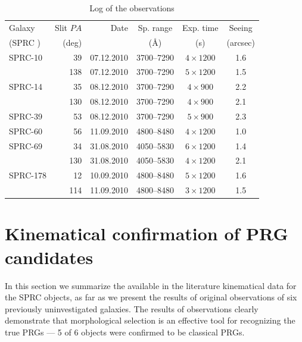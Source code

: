 \documentclass[useAMS,usenatbib]{mn2e}
\begin{document}
\begin{table}
\caption{Log of the observations}\label{tab_obs}
\begin{tabular}{lrrccc}
\hline
Galaxy    & Slit $PA$ & Date             & Sp. range        &  Exp. time             &  Seeing  \\
(SPRC )  &   (deg)&                       &  (\AA)               &     (s)                       &   (arcsec)\\
\hline
SPRC-10        &  39       & 07.12.2010  &    3700--7290 &    $4\times1200$ &   1.6\\
               &  138      & 07.12.2010  &    3700--7290 &    $5\times1200$ &   1.5\\
SPRC-14        &  35       & 08.12.2010  &    3700--7290 &    $4\times900$ &   2.2\\
               &  130      & 08.12.2010  &    3700--7290 &    $4\times900$ &   2.1\\
SPRC-39        &  53       & 08.12.2010  &    3700--7290 &    $5\times900$  &   2.3\\
SPRC-60        &  56       & 11.09.2010  &    4800--8480 &    $4\times1200$ &   1.0\\
SPRC-69        &  34       & 31.08.2010  &    4050--5830 &    $6\times1200$ &   1.4\\
               &  130      & 31.08.2010  &    4050--5830 &    $4\times1200$ &   2.1\\
SPRC-178       &  12       & 10.09.2010  &    4800--8480 &    $5\times1200$ &   1.6\\
               &  114      & 11.09.2010  &    4800--8480 &    $3\times1200$ &   1.5\\
  \hline
\end{tabular}
\end{table}



\section{Kinematical confirmation of PRG candidates}
\label{sect_obs}

 In this section we summarize the available in the literature kinematical data for the SPRC objects, as far as
we present the results of original observations of six previously uninvestigated galaxies.
The results of observations clearly demonstrate  that morphological selection is an effective
tool for recognizing  the true PRGs --- 5 of 6 objects were confirmed to be classical PRGs.
\end{document}
